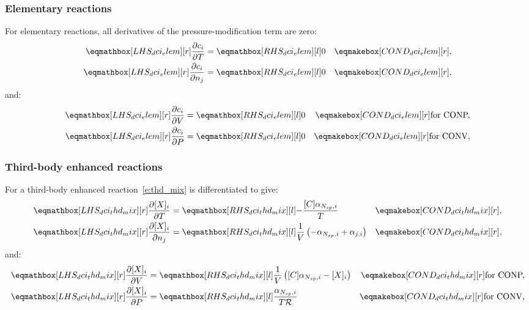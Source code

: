 \documentclass[12pt]{article}
\newcommand{\ns}{N_{sp}}
\newcommand{\conp}{CONP}
\newcommand{\conv}{CONV}
\newcommand{\dconp}{\ifmmode\text{for \conp,}\else for \conp,\fi}
\newcommand{\dconv}{\ifmmode\text{for \conv,}\else for \conv,\fi}
\newcommand{\Ru}{\mathcal{R}}
\begin{document}
\subsubsection{Elementary reactions}
For elementary reactions, all derivatives of the pressure-modification term are zero:
\begin{align}
\lhs{dci_elem}{\frac{\partial c_{i} }{\partial T }} &= \rhs{dci_elem}{0} & \cond{dci_elem}{,} \label{e:dci_elem_dt} \\
\lhs{dci_elem}{\frac{\partial c_{i} }{\partial {n_j} }} &= \rhs{dci_elem}{0} & \cond{dci_elem}{,} \label{e:dci_elem_dnj} \\
\end{align}
and:
\begin{subequations}
 \label{e:dci_elem_de}
 \begin{align}
  \lhs{dci_elem}{\frac{\partial c_{i} }{\partial V }} &= \rhs{dci_elem}{0} & \cond{dci_elem}{\dconp} \\
  \lhs{dci_elem}{\frac{\partial c_{i} }{\partial P }} &= \rhs{dci_elem}{0} & \cond{dci_elem}{\dconv}
 \end{align}
\end{subequations}


\subsubsection{Third-body enhanced reactions}
For a third-body enhanced reaction~\cref{e:thd_mix} is differentiated to give:
\begin{align}
 \lhs{dci_thd_mix}{\frac{\partial [X]_i }{\partial T }} &= \rhs{dci_thd_mix}{-\frac{[C] \alpha_{\ns,i}}{T}} & \cond{dci_thd_mix}{,} \label{e:dci_thd_dt} \\
 \lhs{dci_thd_mix}{\frac{\partial [X]_i }{\partial n_{j}}} &= \rhs{dci_thd_mix}{\frac{1}{V} \left(- \alpha_{\ns,i} + \alpha_{j,i}\right)} & \cond{dci_thd_mix}{,} \label{e:dci_thd_dnj}
\end{align}
and:
\begin{subequations}
 \label{e:dci_thd_de}
 \begin{align}
  \lhs{dci_thd_mix}{\frac{\partial [X]_i }{\partial V }} &= \rhs{dci_thd_mix}{\frac{1}{V} \left([C] \alpha_{\ns,i} - [X]_{i}\right)} & \cond{dci_thd_mix}{\dconp}\\
  \lhs{dci_thd_mix}{\frac{\partial [X]_i }{\partial P }} &= \rhs{dci_thd_mix}{\frac{\alpha_{\ns,i}}{T \Ru}} & \cond{dci_thd_mix}{\dconv}
 \end{align}
\end{subequations}
\end{document}

